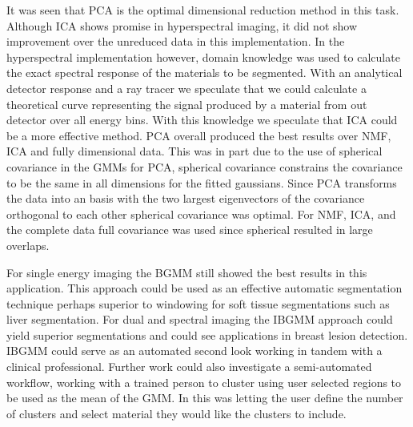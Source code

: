 \documentclass[a4paper,11pt]{article}
\begin{document}

It was seen that PCA is the optimal dimensional reduction method in this task. Although ICA shows promise in hyperspectral imaging, it did not show improvement over the unreduced data in this implementation. In the hyperspectral implementation however, domain knowledge was used to calculate the exact spectral response of the materials to be segmented. With an analytical detector response and a ray tracer we speculate that we could calculate a theoretical curve representing the signal produced by a material from out detector over all energy bins. With this knowledge we speculate that ICA could be a more effective method. PCA overall produced the best results over NMF, ICA and fully dimensional data. This was in part due to the use of spherical covariance in the GMMs for PCA, spherical covariance constrains the covariance to be the same in all dimensions for the fitted gaussians. Since PCA transforms the data into an basis with the two largest eigenvectors of the covariance orthogonal to each other spherical covariance was optimal. For NMF, ICA, and the complete data full covariance was used since spherical resulted in large overlaps.

For single energy imaging the BGMM still showed the best results in this application. This approach could be used as an effective automatic segmentation technique perhaps superior to windowing for soft tissue segmentations such as liver segmentation. For dual and spectral imaging the IBGMM approach could yield superior segmentations and could see applications in breast lesion detection. IBGMM could serve as an automated second look working in tandem with a clinical professional. Further work could also investigate a semi-automated workflow, working with a trained person to cluster using user selected regions to be used as the mean of the GMM. In this was letting the user define the number of clusters and select material they would like the clusters to include.

\end{document}
